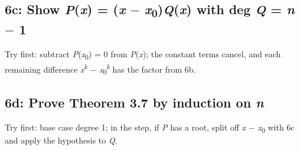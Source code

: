 \documentclass[11pt]{article}
\begin{document}
\begin{keepsection}
\begin{keepsection}
\subsection{6c: Show \textit{P}(\textit{x}) = (\textit{x} \ensuremath{-} \textit{x}\textsubscript{0})\textit{Q}(\textit{x}) with deg \textit{Q} = \textit{n} \ensuremath{-} 1}

Try first: subtract \textit{P}(\textit{x}\textsubscript{0}) = 0 from \textit{P}(\textit{x}); the constant terms cancel, and each remaining difference \textit{x}\textsuperscript{\textit{k}} \ensuremath{-} \textit{x}\textsubscript{0}\textsuperscript{\textit{k}} has the factor from 6b.

\end{keepsection}

\begin{keepsection}
\subsection{6d: Prove Theorem 3.7 by induction on \textit{n}}

Try first: base case degree 1; in the step, if \textit{P} has a root, split off \textit{x} \ensuremath{-} \textit{x}\textsubscript{0} with 6c and apply the hypothesis to \textit{Q}.

\end{keepsection}
\end{keepsection}
\end{document}

